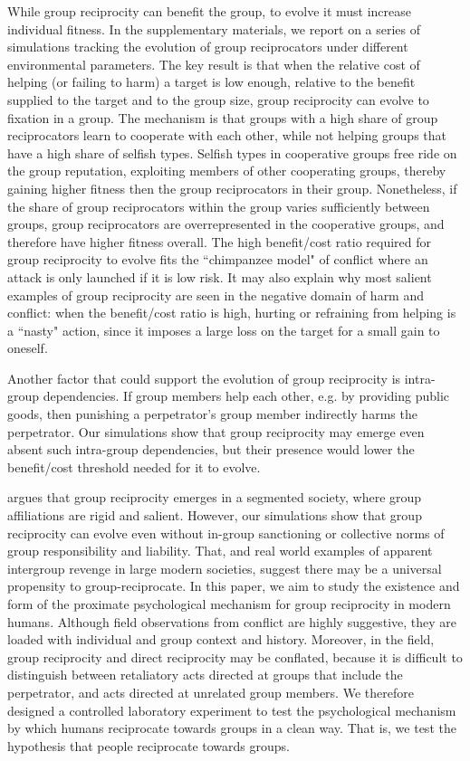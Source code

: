 \documentclass[12pt,a4paper]{article}\usepackage[]{graphicx}\usepackage[]{color}
\begin{document}
While group reciprocity can benefit the group, to evolve it must increase individual fitness. In the
supplementary materials, we report on a series of simulations tracking the evolution of group reciprocators under different
environmental parameters. The key result is that when the relative cost of helping (or failing to harm) a target is low
enough, relative to the benefit supplied to the target and to the group size, group reciprocity can evolve to fixation in a group. The mechanism is that groups 
with a high share of group
reciprocators learn to cooperate with each other, while not helping groups that have a high share of selfish types. 
Selfish types in cooperative groups free ride on the group reputation,
exploiting members of other cooperating groups, thereby gaining higher fitness then the group reciprocators in their group.
Nonetheless, if the share of group reciprocators within the group varies sufficiently between groups, group reciprocators 
are overrepresented in the cooperative groups, and therefore have higher fitness overall. The high benefit/cost ratio required for
group reciprocity to evolve fits the ``chimpanzee model" of conflict where an attack is 
only launched if it is low risk. It may also explain why most salient examples of group reciprocity are seen in the
negative domain of harm and conflict: when the benefit/cost ratio is high, hurting or refraining from helping is a ``nasty" action, 
since it imposes a large loss on the target for a small gain to oneself.

Another factor that could support the evolution of group reciprocity is intra-group dependencies. If group members help 
each other, e.g. by providing public goods, then punishing a perpetrator's group member indirectly harms the perpetrator.
Our simulations show that group reciprocity may emerge even absent such intra-group dependencies, but their presence
would lower the benefit/cost threshold needed for it to evolve.

\citet{kelly2000warless} argues that group reciprocity emerges in a segmented society, where group affiliations are rigid and salient.
However, our simulations show that group reciprocity can evolve even without in-group sanctioning or collective norms of
group responsibility and liability. That, and real world examples of apparent intergroup revenge in large modern societies,
suggest there may be a universal propensity to group-reciprocate. In this paper, we aim to study the existence and form of the proximate
psychological mechanism for group reciprocity in modern humans. Although field observations from conflict are highly 
suggestive, they are loaded with individual and group context and history. Moreover, in the field, group 
reciprocity and direct reciprocity may be conflated, because 
it is difficult to distinguish between retaliatory acts directed at groups that include the perpetrator, and acts 
directed at unrelated group members. We therefore designed a controlled laboratory experiment to test the psychological
mechanism by which humans reciprocate towards groups in a clean way. That is, we test the hypothesis that people 
reciprocate towards groups.
 
\end{document}
